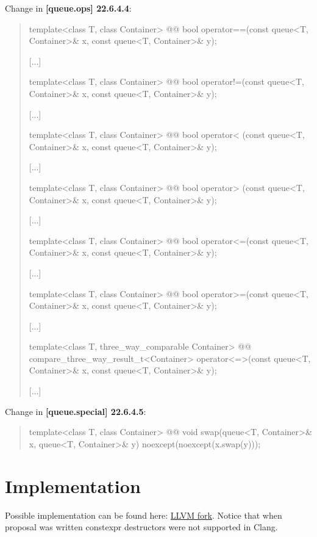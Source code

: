 \documentclass{wg21}
\begin{document}
Change in \textbf{[queue.ops] 22.6.4.4}:
\begin{quote}
\begin{itemdecl}
template<class T, class Container>
  @@ bool operator==(const queue<T, Container>& x, const queue<T, Container>& y);
\end{itemdecl}
[...]
\begin{itemdecl}
template<class T, class Container>
  @@ bool operator!=(const queue<T, Container>& x,  const queue<T, Container>& y);
\end{itemdecl}
[...]
\begin{itemdecl}
template<class T, class Container>
  @@ bool operator< (const queue<T, Container>& x, const queue<T, Container>& y);
\end{itemdecl}
[...]
\begin{itemdecl}
template<class T, class Container>
  @@ bool operator> (const queue<T, Container>& x, const queue<T, Container>& y);
\end{itemdecl}
[...]
\begin{itemdecl}
template<class T, class Container>
  @@ bool operator<=(const queue<T, Container>& x, const queue<T, Container>& y);
\end{itemdecl}
[...]
\begin{itemdecl}
template<class T, class Container>
  @@ bool operator>=(const queue<T, Container>& x,
                                      const queue<T, Container>& y);
\end{itemdecl}
[...]
\begin{itemdecl}
template<class T, three_way_comparable Container>
  @@ compare_three_way_result_t<Container>
    operator<=>(const queue<T, Container>& x, const queue<T, Container>& y);	
\end{itemdecl}
[...]
\end{quote}

Change in \textbf{[queue.special] 22.6.4.5}:
\begin{quote}
\begin{itemdecl}
template<class T, class Container>
  @@ void swap(queue<T, Container>& x, queue<T, Container>& y) 
    noexcept(noexcept(x.swap(y)));
\end{itemdecl}

\end{quote}

\section{Implementation}
Possible implementation can be found here: \href{https://github.com/ZaMaZaN4iK/llvm-project/tree/feature/queue_constexpr}{LLVM fork}. Notice that when proposal was written constexpr destructors were not supported in Clang.
\end{document}
